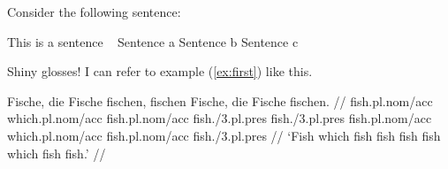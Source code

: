 \documentclass{article}
\title{}
\author{}
\date{}
\begin{document}
Consider the following sentence:

\ex This is a sentence \label{ex:first}
\xe
\pex~ %
\a \ljudge{*} Sentence a
\a \ljudge{\#} Sentence b
\a Sentence c
\xe

Shiny glosses! I can refer to example (\ref{ex:first}) like this. %

\ex
\begingl
\gla Fische, die Fische fischen, fischen Fische, die Fische fischen. //
\glb fish.{\sc pl.nom/acc} which.{\sc pl.nom/acc} fish.{\sc pl.nom/acc} fish.{/3.pl.pres} fish.{/3.pl.pres} fish.{\sc pl.nom/acc} which.{\sc pl.nom/acc} fish.{\sc pl.nom/acc} fish.{/3.pl.pres} //
\glft `Fish which fish fish fish fish which fish fish.' //
\endgl
\xe
\end{document}
